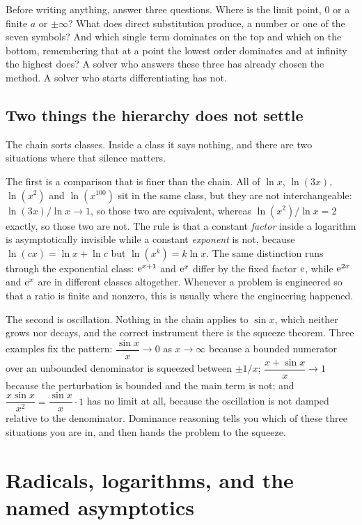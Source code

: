 \begin{keynote}
Before writing anything, answer three questions. Where is the limit point, $0$ or a finite $a$ or $\pm\infty$? What does direct substitution produce, a number or one of the seven symbols? And which single term dominates on the top and which on the bottom, remembering that at a point the lowest order dominates and at infinity the highest does? A solver who answers these three has already chosen the method. A solver who starts differentiating has not.
\end{keynote}

\subsection{Two things the hierarchy does not settle}

The chain sorts classes. Inside a class it says nothing, and there are two situations where that silence matters.

The first is a comparison that is finer than the chain. All of $\ln x$, $\ln(3x)$, $\ln(x^{2})$ and $\ln(x^{100})$ sit in the same class, but they are not interchangeable: $\ln(3x)/\ln x\to1$, so those two are equivalent, whereas $\ln(x^{2})/\ln x=2$ exactly, so those two are not. The rule is that a constant \emph{factor} inside a logarithm is asymptotically invisible while a constant \emph{exponent} is not, because $\ln(cx)=\ln x+\ln c$ but $\ln(x^{k})=k\ln x$. The same distinction runs through the exponential class: $\mathrm{e}^{x+1}$ and $\mathrm{e}^{x}$ differ by the fixed factor $\mathrm{e}$, while $\mathrm{e}^{2x}$ and $\mathrm{e}^{x}$ are in different classes altogether. Whenever a problem is engineered so that a ratio is finite and nonzero, this is usually where the engineering happened.

The second is oscillation. Nothing in the chain applies to $\sin x$, which neither grows nor decays, and the correct instrument there is the squeeze theorem. Three examples fix the pattern: $\dfrac{\sin x}{x}\to0$ as $x\to\infty$ because a bounded numerator over an unbounded denominator is squeezed between $\pm1/x$; $\dfrac{x+\sin x}{x}\to1$ because the perturbation is bounded and the main term is not; and $\dfrac{x\sin x}{x^{2}}=\dfrac{\sin x}{x}\cdot 1$ has no limit at all, because the oscillation is not damped relative to the denominator. Dominance reasoning tells you which of these three situations you are in, and then hands the problem to the squeeze.

\section{Radicals, logarithms, and the named asymptotics}

